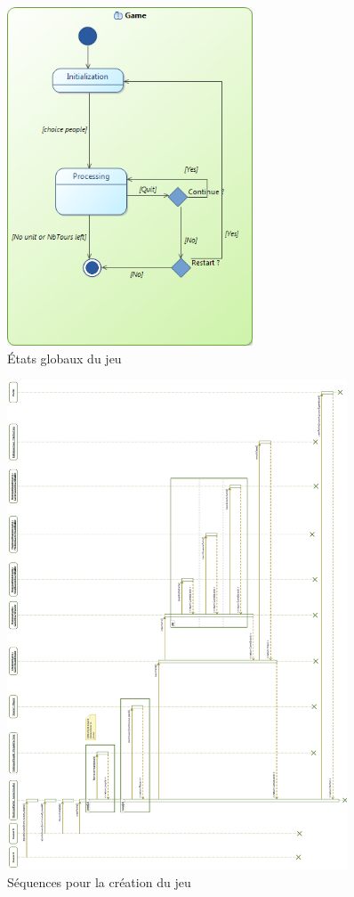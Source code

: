 \documentclass[a4paper]{article}
\begin{document}
\begin{figure}[ht]
\centering
	\includegraphics[width=0.65\textwidth, height=0.5\textheight]{../Schemas/machine_etat_jeu.png}
		\caption{États globaux du jeu}
		\label{fig:machine_jeu}
\end{figure}

\begin{figure}[ht]
\centering
	\includegraphics[width=0.9\textwidth, height=0.9\textheight]{../Schemas/sequence_creerPartie.png}
		\caption{Séquences pour la création du jeu}
		\label{fig:sequence_creation}
\end{figure}
\end{document}
